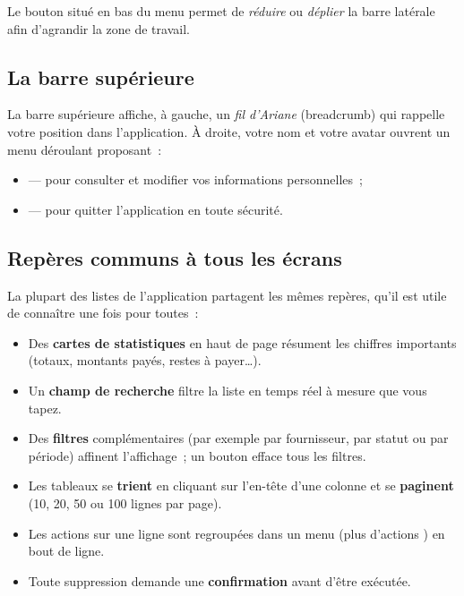 Le bouton situé en bas du menu permet de \emph{réduire} ou \emph{déplier} la barre latérale afin d'agrandir la zone de travail.


\subsection{La barre supérieure}

La barre supérieure affiche, à gauche, un \emph{fil d'Ariane} (breadcrumb) qui rappelle votre position dans l'application. À droite, votre nom et votre avatar ouvrent un menu déroulant proposant~:

\begin{itemize}
  \item {} — pour consulter et modifier vos informations personnelles~;
  \item {} — pour quitter l'application en toute sécurité.
\end{itemize}

\subsection{Repères communs à tous les écrans}

La plupart des listes de l'application partagent les mêmes repères, qu'il est utile de connaître une fois pour toutes~:

\begin{itemize}
  \item Des \textbf{cartes de statistiques} en haut de page résument les chiffres importants (totaux, montants payés, restes à payer\ldots).
  \item Un \textbf{champ de recherche} filtre la liste en temps réel à mesure que vous tapez.
  \item Des \textbf{filtres} complémentaires (par exemple par fournisseur, par statut ou par période) affinent l'affichage~; un bouton  efface tous les filtres.
  \item Les tableaux se \textbf{trient} en cliquant sur l'en-tête d'une colonne et se \textbf{paginent} (10, 20, 50 ou 100 lignes par page).
  \item Les actions sur une ligne sont regroupées dans un menu \bouton{\ldots} (\og plus d'actions \fg{}) en bout de ligne.
  \item Toute suppression demande une \textbf{confirmation} avant d'être exécutée.
\end{itemize}

